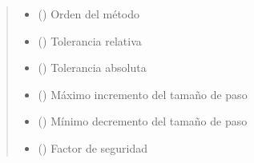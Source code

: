 \documentclass[letterpaper,10pt,spanish]{sphinxmanual}
\begin{document}
\begin{fulllineitems}
\begin{quote}
\begin{description}
\begin{itemize}
\item {} 
 () \textendash{} Orden del método

\item {} 
 () \textendash{} Tolerancia relativa

\item {} 
 () \textendash{} Tolerancia absoluta

\item {} 
 () \textendash{} Máximo incremento del tamaño de paso

\item {} 
 () \textendash{} Mínimo decremento del tamaño de paso

\item {} 
 () \textendash{} Factor de seguridad

\end{itemize}

\end{description}\end{quote}

\end{fulllineitems}

\end{document}
